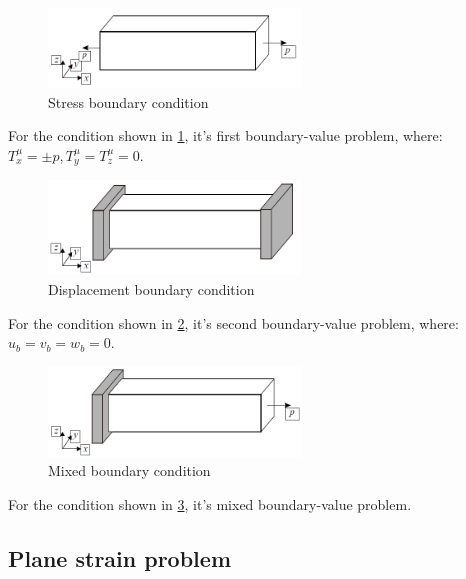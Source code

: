 \documentclass[en,hazy,cyan,8pt,normal]{elegantnote}
\numberwithin{equation}{section}
\begin{document}
    \begin{figure}[H]
      \centering
      \includegraphics[width=0.6\textwidth]{image/023.png}
      \caption{Stress boundary condition}
      \label{fig:023}
    \end{figure}

    For the condition shown in \cref{fig:023}, it's first boundary-value problem, where: $T_x^{\mu} = \pm p, T_y^{\mu} = T_z^{\mu} = 0$.

    \begin{figure}[H]
      \centering
      \includegraphics[width=0.6\textwidth]{image/024.png}
      \caption{Displacement boundary condition}
      \label{fig:024}
    \end{figure}

    For the condition shown in \cref{fig:024}, it's second boundary-value problem, where: $u_b = v_b = w_b = 0$.

    \begin{figure}[H]
      \centering
      \includegraphics[width=0.6\textwidth]{image/025.png}
      \caption{Mixed boundary condition}
      \label{fig:025}
    \end{figure}

    For the condition shown in \cref{fig:025}, it's mixed boundary-value problem.

  \subsection{Plane strain problem}\label{subsec:04.02}
    
\end{document}
